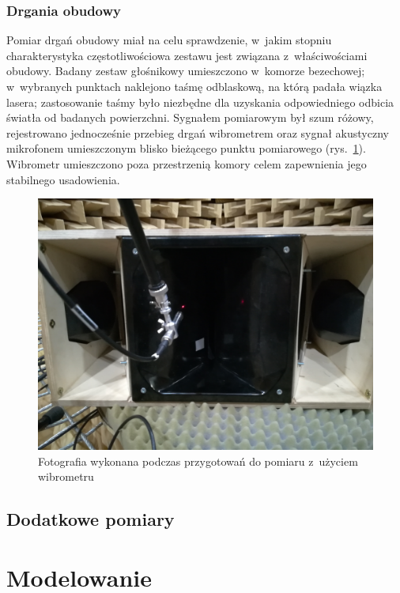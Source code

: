\documentclass[12pt]{oska}
\begin{document}
			
		\subsubsection{Drgania obudowy}
			
			Pomiar drgań obudowy miał na celu sprawdzenie, w~jakim stopniu charakterystyka częstotliwościowa zestawu jest związana z~właściwościami obudowy. Badany zestaw głośnikowy umieszczono w~komorze bezechowej; w~wybranych punktach naklejono taśmę odblaskową, na którą padała wiązka lasera; zastosowanie taśmy było niezbędne dla uzyskania odpowiedniego odbicia światła od badanych powierzchni. %
			Sygnałem pomiarowym był szum różowy, rejestrowano jednocześnie przebieg drgań wibrometrem oraz sygnał akustyczny mikrofonem umieszczonym blisko bieżącego punktu pomiarowego (rys.~\ref{r:zdjecie_wibro}). Wibrometr umieszczono poza przestrzenią komory celem zapewnienia jego stabilnego usadowienia.
			
			\begin{figure}[!h]
				\centering
				\includegraphics[width=.8\textwidth]{zdjecie_wibro.jpg}
				\caption{Fotografia wykonana podczas przygotowań do pomiaru z~użyciem wibrometru}
				\label{r:zdjecie_wibro}
			\end{figure}

	
	\subsection{Dodatkowe pomiary}\label{ss:dodatkowe}

\section{Modelowanie}
\end{document}
